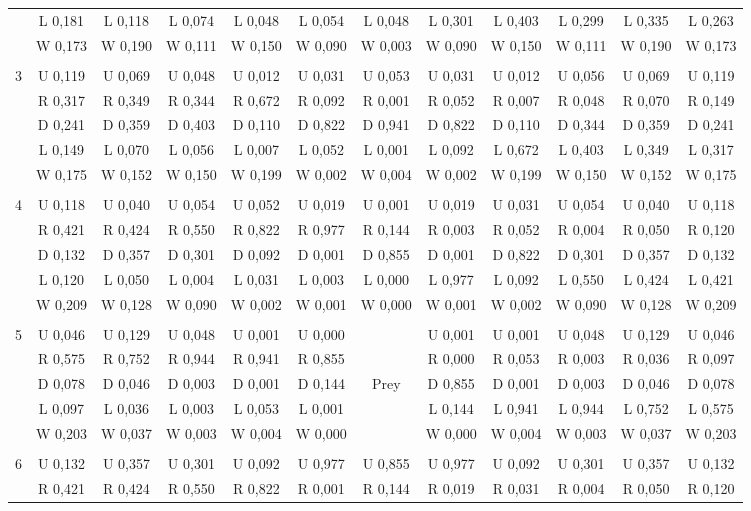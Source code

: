 \documentclass{article}
\begin{document}
\begin{table}[htbp]
\begin{footnotesize}
\begin{tabular}{c|c|c|c|c|c|c|c|c|c|c|c|}
&L 0,181&L 0,118&L 0,074&L 0,048&L 0,054&L 0,048&L 0,301&L 0,403&L 0,299&L 0,335&L 0,263\\
&W 0,173&W 0,190&W 0,111&W 0,150&W 0,090&W 0,003&W 0,090&W 0,150&W 0,111&W 0,190&W 0,173\\
\hline \\
3&U 0,119&U 0,069&U 0,048&U 0,012&U 0,031&U 0,053&U 0,031&U 0,012&U 0,056&U 0,069&U 0,119\\
&R 0,317&R 0,349&R 0,344&R 0,672&R 0,092&R 0,001&R 0,052&R 0,007&R 0,048&R 0,070&R 0,149\\
&D 0,241&D 0,359&D 0,403&D 0,110&D 0,822&D 0,941&D 0,822&D 0,110&D 0,344&D 0,359&D 0,241\\
&L 0,149&L 0,070&L 0,056&L 0,007&L 0,052&L 0,001&L 0,092&L 0,672&L 0,403&L 0,349&L 0,317\\
&W 0,175&W 0,152&W 0,150&W 0,199&W 0,002&W 0,004&W 0,002&W 0,199&W 0,150&W 0,152&W 0,175\\
\hline \\
4&U 0,118&U 0,040&U 0,054&U 0,052&U 0,019&U 0,001&U 0,019&U 0,031&U 0,054&U 0,040&U 0,118\\
&R 0,421&R 0,424&R 0,550&R 0,822&R 0,977&R 0,144&R 0,003&R 0,052&R 0,004&R 0,050&R 0,120\\
&D 0,132&D 0,357&D 0,301&D 0,092&D 0,001&D 0,855&D 0,001&D 0,822&D 0,301&D 0,357&D 0,132\\
&L 0,120&L 0,050&L 0,004&L 0,031&L 0,003&L 0,000&L 0,977&L 0,092&L 0,550&L 0,424&L 0,421\\
&W 0,209&W 0,128&W 0,090&W 0,002&W 0,001&W 0,000&W 0,001&W 0,002&W 0,090&W 0,128&W 0,209\\
\hline \\
5&U 0,046&U 0,129&U 0,048&U 0,001&U 0,000&&U 0,001&U 0,001&U 0,048&U 0,129&U 0,046\\
&R 0,575&R 0,752&R 0,944&R 0,941&R 0,855&&R 0,000&R 0,053&R 0,003&R 0,036&R 0,097\\
&D 0,078&D 0,046&D 0,003&D 0,001&D 0,144&Prey&D 0,855&D 0,001&D 0,003&D 0,046&D 0,078\\
&L 0,097&L 0,036&L 0,003&L 0,053&L 0,001&&L 0,144&L 0,941&L 0,944&L 0,752&L 0,575\\
&W 0,203&W 0,037&W 0,003&W 0,004&W 0,000&&W 0,000&W 0,004&W 0,003&W 0,037&W 0,203\\
\hline \\
6&U 0,132&U 0,357&U 0,301&U 0,092&U 0,977&U 0,855&U 0,977&U 0,092&U 0,301&U 0,357&U 0,132\\
&R 0,421&R 0,424&R 0,550&R 0,822&R 0,001&R 0,144&R 0,019&R 0,031&R 0,004&R 0,050&R 0,120\\

\end{tabular}
\end{footnotesize}
\end{table}
\end{document}
